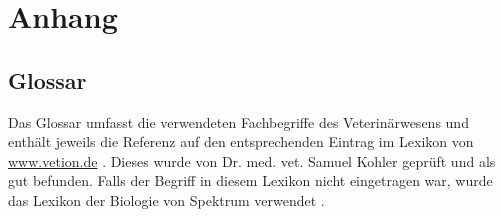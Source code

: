 

\chapter{Anhang}
\section{Glossar}
Das Glossar umfasst die verwendeten Fachbegriffe des Veterinärwesens und enthält jeweils die Referenz auf den entsprechenden Eintrag im Lexikon von \newline \url{www.vetion.de} \citep{GmbH2009}. Dieses wurde von Dr. med. vet. Samuel Kohler geprüft und als gut befunden. Falls der Begriff in diesem Lexikon nicht eingetragen war, wurde das \glqq{}Lexikon der Biologie\grqq{} von Spektrum verwendet \citep{Sauermost1999a}.
	



	

